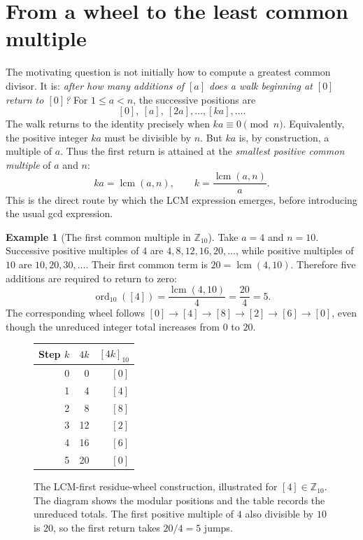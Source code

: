 \documentclass[11pt,a4paper]{article}
\theoremstyle{definition}
\newtheorem{example}[theorem]{Example}
\theoremstyle{remark}
\DeclareMathOperator{\ord}{ord}
\DeclareMathOperator{\lcm}{lcm}
\begin{document}
\section{From a wheel to the least common multiple}
The motivating question is not initially how to compute a greatest common divisor. It is: \emph{after how many additions of $[a]$ does a walk beginning at $[0]$ return to $[0]$?} For $1\le a<n$, the successive positions are
\[
[0],\ [a],\ [2a],\ldots,[ka],\ldots.
\]
The walk returns to the identity precisely when $ka\equiv0\pmod n$. Equivalently, the positive integer $ka$ must be divisible by $n$. But $ka$ is, by construction, a multiple of $a$. Thus the first return is attained at the \emph{smallest positive common multiple} of $a$ and $n$:
\[
ka=\lcm(a,n),\qquad k=\frac{\lcm(a,n)}{a}.
\]
This is the direct route by which the LCM expression emerges, before introducing the usual gcd expression.

\begin{example}[The first common multiple in $\mathbb Z_{10}$]
Take $a=4$ and $n=10$. Successive positive multiples of $4$ are $4,8,12,16,20,\ldots$, while positive multiples of $10$ are $10,20,30,\ldots$. Their first common term is $20=\lcm(4,10)$. Therefore five additions are required to return to zero:
\[
\ord_{10}([4])=\frac{\lcm(4,10)}{4}=\frac{20}{4}=5.
\]
The corresponding wheel follows $[0]\to[4]\to[8]\to[2]\to[6]\to[0]$, even though the unreduced integer total increases from $0$ to $20$.
\end{example}

\begin{figure}[ht]
\centering
\begin{minipage}[c]{.43\textwidth}
\centering
{}
\end{minipage}\hfill
\begin{minipage}[c]{.51\textwidth}
\centering
\begin{tabular}{@{}rrr@{}}\toprule
Step $k$ & $4k$ & $[4k]_{10}$ \\\midrule
0&0&$[0]$\\
1&4&$[4]$\\
2&8&$[8]$\\
3&12&$[2]$\\
4&16&$[6]$\\
5&20&$[0]$\\\bottomrule
\end{tabular}
\end{minipage}
\caption{The LCM-first residue-wheel construction, illustrated for $[4]\in\mathbb Z_{10}$. The diagram shows the modular positions and the table records the unreduced totals. The first positive multiple of $4$ also divisible by $10$ is $20$, so the first return takes $20/4=5$ jumps.}
\label{fig:lcmwheel}
\end{figure}
\end{document}
